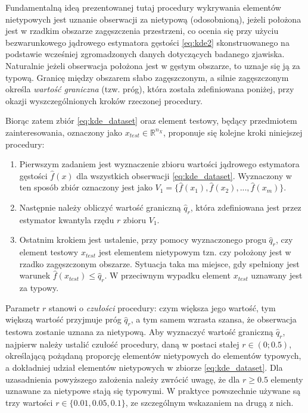 \documentclass[12pt,a4paper,oneside]{book}
\theoremstyle{definition}
\begin{document}
Fundamentalną ideą prezentowanej tutaj procedury wykrywania elementów nietypowych jest uznanie obserwacji za nietypową (odosobnioną), jeżeli położona jest w rzadkim obszarze zagęszczenia przestrzeni, co ocenia się przy użyciu bezwarunkowego jądrowego estymatora gęstości \eqref{eq:kde2} skonstruowanego na podstawie wcześniej zgromadzonych danych dotyczących badanego zjawiska. Naturalnie jeżeli obserwacja położona jest w gęstym obszarze, to uznaje się ją za typową. Granicę między obszarem słabo zagęszczonym, a silnie zagęszczonym określa \textit{wartość graniczna} (tzw. próg), która została zdefiniowana poniżej, przy okazji wyszczególnionych kroków rzeczonej procedury.

Biorąc zatem zbiór \eqref{eq:kde_dataset} oraz element testowy, będący przedmiotem zainteresowania, oznaczony jako $x_{test} \in \mathbb{R}^{n_X}$, proponuje się kolejne kroki niniejszej procedury:
\begin{enumerate}
\item Pierwszym zadaniem jest wyznaczenie zbioru wartości jądrowego estymatora gęstości $\hat{f}(x)$ dla wszystkich obserwacji \eqref{eq:kde_dataset}. Wyznaczony w ten sposób zbiór oznaczony jest jako $V_1=\{\hat{f}(x_1),\hat{f}(x_2), ..., \hat{f}(x_m)\}$.
\item Następnie należy obliczyć wartość graniczną $\hat{q}_r$, która zdefiniowana jest przez estymator kwantyla \cite{Hyndman_1996, Walker_1958} rzędu $r$ zbioru $V_1$.
\item \label{outliers_step_3} Ostatnim krokiem jest ustalenie, przy pomocy wyznaczonego progu $\hat{q}_r$, czy element testowy $x_{test}$ jest elementem nietypowym tzn. czy położony jest w rzadko zagęszczonym obszarze. Sytuacja taka ma miejsce, gdy spełniony jest warunek $\hat{f}(x_{test}) \leq \hat{q}_r$. W przeciwnym wypadku element $x_{test}$ uznawany jest za typowy.
\end{enumerate}
Parametr $r$ stanowi o \textit{czułości} procedury: czym większa jego wartość, tym większą wartość przyjmuje próg $\hat{q}_r$, a tym samem wzrasta szansa, że obserwacja testowa zostanie uznana za nietypową. Aby wyznaczyć wartość graniczną $\hat{q}_r$, najpierw należy ustalić czułość procedury, daną w postaci stałej $r \in (0; 0.5)$, określającą pożądaną proporcję elementów nietypowych do elementów typowych, a dokładniej udział elementów nietypowych w zbiorze \eqref{eq:kde_dataset}. Dla uzasadnienia powyższego założenia należy zwrócić uwagę, że dla $r \geq 0.5$ elementy uznawane za nietypowe stają  się typowymi. W praktyce powszechnie używane są trzy wartości $r \in \{0.01,0.05,0.1\}$, ze szczególnym wskazaniem na drugą z nich.
\end{document}
